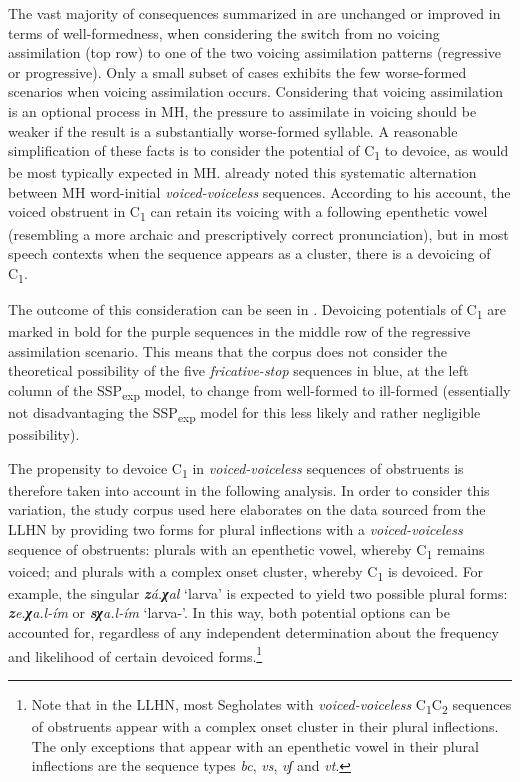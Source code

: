 The vast majority of consequences summarized in  are unchanged or improved in terms of well-formedness, when considering the switch from no voicing assimilation (top row) to one of the two voicing assimilation patterns (regressive or progressive). 
Only a small subset of cases exhibits the few worse-formed scenarios when voicing assimilation occurs.
Considering that voicing assimilation is an optional process in MH, the pressure to assimilate in voicing should be weaker if the result is a substantially worse-formed syllable. A reasonable simplification of these facts is to consider the potential of C\textsubscript{1} to devoice, as would be most typically expected in MH.
\citet[232]{bolozky2006notesk} already noted this systematic alternation between MH word-initial \emph{voiced-voiceless} sequences. According to his account, the voiced obstruent in C\textsubscript{1} can retain its voicing with a following epenthetic vowel (resembling a more archaic and prescriptively correct pronunciation), but in most speech contexts when the sequence appears as a cluster, there is a devoicing of C\textsubscript{1}.

The outcome of this consideration can be seen in . Devoicing potentials of C\textsubscript{1} are marked in bold for the purple sequences in the middle row of the regressive assimilation scenario. This means that the corpus does not consider the theoretical possibility of the five \emph{fricative-stop} sequences in blue, at the left column of the SSP\textsubscript{exp} model, to change from well-formed to ill-formed (essentially not disadvantaging the SSP\textsubscript{exp} model for this less likely and rather negligible possibility).

The propensity to devoice C\textsubscript{1} in \emph{voiced-voiceless} sequences of obstruents is therefore taken into account in the following analysis. In order to consider this variation, the study corpus used here elaborates on the data sourced from the LLHN by providing two forms for plural inflections with a \emph{voiced-voiceless} sequence of obstruents: plurals with an epenthetic vowel, whereby C\textsubscript{1} remains voiced; and plurals with a complex onset cluster, whereby C\textsubscript{1} is devoiced. For example, the singular \emph{\textbf{z}á.\textbf{χ}al} `larva' is expected to yield two possible plural forms: \emph{\textbf{z}e.\textbf{χ}a.l-ím} or \emph{\textbf{sχ}a.l-ím} `larva-\Pl{}'. In this way, both potential options can be accounted for, regardless of any independent determination about the frequency and likelihood of certain devoiced forms.\footnote{Note that in the LLHN, most Segholates with \emph{voiced-voiceless} C\textsubscript{1}C\textsubscript{2} sequences of obstruents appear with a complex onset cluster in their plural inflections. The only exceptions that appear with an epenthetic vowel in their plural inflections are the sequence types \emph{bc}, \emph{vs}, \emph{vʃ} and \emph{vt}.}

